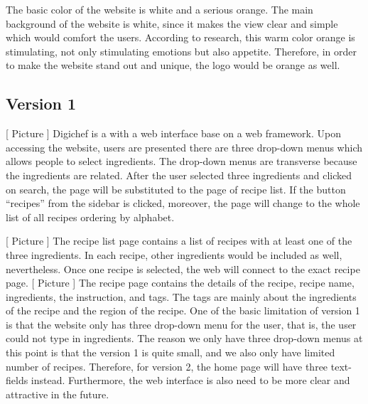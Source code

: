 The basic color of the website is white and a serious orange. The main background of the website is white, since it makes the view clear and simple which would comfort the users. According to research, this warm color orange is stimulating, not only stimulating emotions but also appetite. Therefore, in order to make the website stand out and unique, the logo would be orange as well.

\subsection{Version 1}

[ Picture ]
Digichef is a with a web interface base on a web framework. Upon accessing the website, users are presented there are three drop-down menus which allows people to select ingredients. The drop-down menus are transverse because the ingredients are related. After the user selected three ingredients and clicked on search, the page will be substituted to the page of recipe list. If the button “recipes” from the sidebar is clicked, moreover, the page will change to the whole list of all recipes ordering by alphabet.

[ Picture ]
The recipe list page contains a list of recipes with at least one of the three ingredients. In each recipe, other ingredients would be included as well, nevertheless. Once one recipe is selected, the web will connect to the exact recipe page.
[ Picture ]
The recipe page contains the details of the recipe, recipe name, ingredients, the instruction, and tags. The tags are mainly about the ingredients of the recipe and the region of the recipe.
One of the basic limitation of version 1 is that the website only has three drop-down menu for the user, that is, the user could not type in ingredients. The reason we only have three drop-down menus at this point is that the version 1 is quite small, and we also only have limited number of recipes. Therefore, for version 2, the home page will have three text-fields instead. Furthermore, the web interface is also need to be more clear and attractive in the future.

